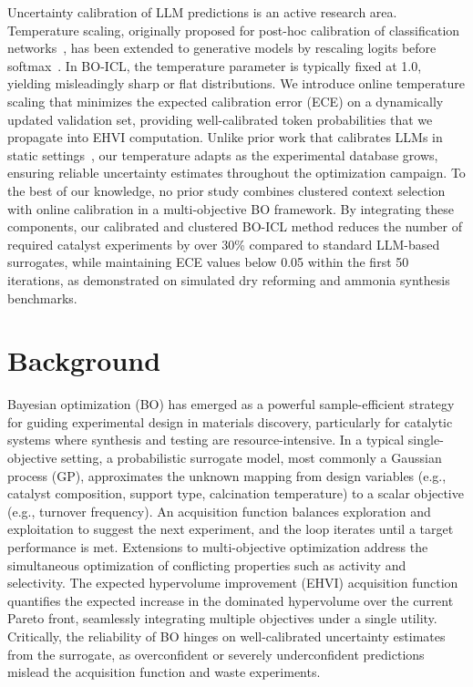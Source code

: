 \documentclass{article}
\begin{document}
Uncertainty calibration of LLM predictions is an active research area. Temperature scaling, originally proposed for post-hoc calibration of classification networks~\cite{guo2017calibration}, has been extended to generative models by rescaling logits before softmax~\cite{kumar2019calibration, desai2022calibration}. In BO-ICL, the temperature parameter is typically fixed at 1.0, yielding misleadingly sharp or flat distributions. We introduce online temperature scaling that minimizes the expected calibration error (ECE) on a dynamically updated validation set, providing well-calibrated token probabilities that we propagate into EHVI computation. Unlike prior work that calibrates LLMs in static settings~\cite{jiang2023how}, our temperature adapts as the experimental database grows, ensuring reliable uncertainty estimates throughout the optimization campaign. To the best of our knowledge, no prior study combines clustered context selection with online calibration in a multi-objective BO framework. By integrating these components, our calibrated and clustered BO-ICL method reduces the number of required catalyst experiments by over 30\% compared to standard LLM-based surrogates, while maintaining ECE values below 0.05 within the first 50 iterations, as demonstrated on simulated dry reforming and ammonia synthesis benchmarks.

\section{Background}

Bayesian optimization (BO) has emerged as a powerful sample-efficient strategy for guiding experimental design in materials discovery, particularly for catalytic systems where synthesis and testing are resource-intensive. In a typical single-objective setting, a probabilistic surrogate model, most commonly a Gaussian process (GP), approximates the unknown mapping from design variables (e.g., catalyst composition, support type, calcination temperature) to a scalar objective (e.g., turnover frequency). An acquisition function balances exploration and exploitation to suggest the next experiment, and the loop iterates until a target performance is met. Extensions to multi-objective optimization address the simultaneous optimization of conflicting properties such as activity and selectivity. The expected hypervolume improvement (EHVI) acquisition function quantifies the expected increase in the dominated hypervolume over the current Pareto front, seamlessly integrating multiple objectives under a single utility. Critically, the reliability of BO hinges on well-calibrated uncertainty estimates from the surrogate, as overconfident or severely underconfident predictions mislead the acquisition function and waste experiments.
\end{document}
